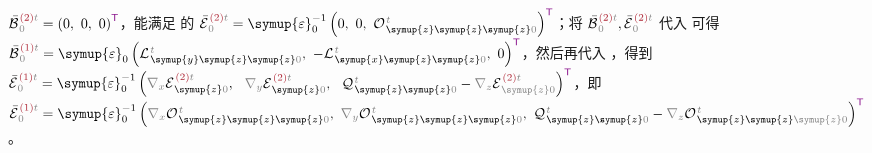 $\bar{\mathcal{B}}^{\;\!\textcolor{Maroon}{(2)}\mathcolor{gray}{t}}_{\;\!  \mathcolor{gray}{0}} = \left( 0,~ 0,~ 0 \right)^{\mathsf{\textcolor{Plum}{T}}}$，能满足  的 $\bar{\mathcal{E}}^{\;\!\textcolor{Maroon}{(2)}\mathcolor{gray}{t}}_{\;\!  \mathcolor{gray}{0}} = {\symup{\varepsilon}}_0^{-1} \left( 0,~ 0,~ {\mathcal{O}}^{\;\!\mathcolor{gray}{t}}_{\;\! \symup{z} \symup{z} \symup{z} \mathcolor{gray}{0}} \right)^{\mathsf{\textcolor{Plum}{T}}}$；将 $\bar{\mathcal{B}}^{\;\!\textcolor{Maroon}{(2)}\mathcolor{gray}{t}}_{\;\!  \mathcolor{gray}{0}},\bar{\mathcal{E}}^{\;\!\textcolor{Maroon}{(2)}\mathcolor{gray}{t}}_{\;\! \mathcolor{gray}{0}}$ 代入  可得 $\bar{\mathcal{B}}^{\;\!\textcolor{Maroon}{(1)}\mathcolor{gray}{t}}_{\;\!  \mathcolor{gray}{0}} = {\symup{\varepsilon}}_0 \left( {\mathcal{L}}^{\;\!\mathcolor{gray}{t}}_{\;\! \symup{y} \symup{z} \symup{z} \mathcolor{gray}{0}},~ - {\mathcal{L}}^{\;\!\mathcolor{gray}{t}}_{\;\! \symup{x} \symup{z} \symup{z} \mathcolor{gray}{0}},~ 0 \right)^{\mathsf{\textcolor{Plum}{T}}}$，然后再代入 ，得到 $\bar{\mathcal{E}}^{\;\!\textcolor{Maroon}{(1)}\mathcolor{gray}{t}}_{\;\!  \mathcolor{gray}{0}} = {\symup{\varepsilon}}_0^{-1} \left( \mathcolor{gray}{\nabla_x} \mathcal{E}^{\;\!\textcolor{Maroon}{(2)}\mathcolor{gray}{t}}_{\;\! \symup{z} \mathcolor{gray}{0}}, \right.$ $\left. \mathcolor{gray}{\nabla_y} \mathcal{E}^{\;\!\textcolor{Maroon}{(2)}\mathcolor{gray}{t}}_{\;\! \symup{z} \mathcolor{gray}{0}},~~ {\mathcal{Q}}^{\;\!\mathcolor{gray}{t}}_{\;\! \symup{z} \symup{z} \mathcolor{gray}{0}} - \mathcolor{gray}{\nabla_z} \mathcal{E}^{\;\!\textcolor{Maroon}{(2)}\mathcolor{gray}{t}}_{\;\! \mathcolor{gray}{\symup{z}} \mathcolor{gray}{0}} \right)^{\mathsf{\textcolor{Plum}{T}}}$，即 $\bar{\mathcal{E}}^{\;\!\textcolor{Maroon}{(1)}\mathcolor{gray}{t}}_{\;\!  \mathcolor{gray}{0}} = {\symup{\varepsilon}}_0^{-1} \left( \mathcolor{gray}{\nabla_x} {\mathcal{O}}^{\;\!\mathcolor{gray}{t}}_{\;\! \symup{z} \symup{z} \symup{z} \mathcolor{gray}{0}},~ \mathcolor{gray}{\nabla_y} {\mathcal{O}}^{\;\!\mathcolor{gray}{t}}_{\;\! \symup{z} \symup{z} \symup{z} \mathcolor{gray}{0}},~ {\mathcal{Q}}^{\;\!\mathcolor{gray}{t}}_{\;\! \symup{z} \symup{z} \mathcolor{gray}{0}} - \mathcolor{gray}{\nabla_z} {\mathcal{O}}^{\;\!\mathcolor{gray}{t}}_{\;\! \symup{z} \symup{z} \mathcolor{gray}{\symup{z}} \mathcolor{gray}{0}} \right)^{\mathsf{\textcolor{Plum}{T}}}$。

